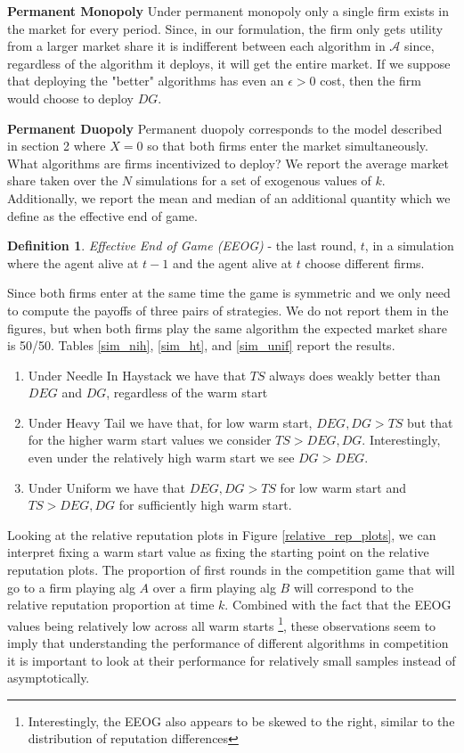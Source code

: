 \documentclass{article}
\theoremstyle{definition}
\newtheorem{definition}{Definition}
\begin{document}
\textbf{Permanent Monopoly} Under permanent monopoly only a single firm exists in the market for every period. Since, in our formulation, the firm only gets utility from a larger market share it is indifferent between each algorithm in $\mathcal{A}$ since, regardless of the algorithm it deploys, it will get the entire market. If we suppose that deploying the "better" algorithms has even an $\epsilon > 0$ cost, then the firm would choose to deploy $DG$.

\textbf{Permanent Duopoly} Permanent duopoly corresponds to the model described in section 2 where $X = 0$ so that both firms enter the market simultaneously. What algorithms are firms incentivized to deploy? We report the average market share taken over the $N$ simulations for a set of exogenous values of $k$. Additionally, we report the mean and median of an additional quantity which we define as the effective end of game.

\begin{definition}
\textit{Effective End of Game (EEOG)} - the last round, $t$, in a simulation where the agent alive at $t-1$ and the agent alive at $t$ choose different firms.
\end{definition}

Since both firms enter at the same time the game is symmetric and we only need to compute the payoffs of three pairs of strategies. We do not report them in the figures, but when both firms play the same algorithm the expected market share is 50/50. Tables \ref{sim_nih}, \ref{sim_ht}, and \ref{sim_unif} report the results.
\begin{enumerate}
\item Under Needle In Haystack we have that $TS$ always does weakly better than $DEG$ and $DG$, regardless of the warm start
\item Under Heavy Tail we have that, for low warm start, $DEG, DG > TS$ but that for the higher warm start values we consider $TS > DEG, DG$. Interestingly, even under the relatively high warm start we see $DG > DEG$.
\item Under Uniform we have that $DEG, DG > TS$ for low warm start and $TS > DEG, DG$ for sufficiently high warm start.
\end{enumerate}

Looking at the relative reputation plots in Figure \ref{relative_rep_plots}, we can interpret fixing a warm start value as fixing the starting point on the relative reputation plots. The proportion of first rounds in the competition game that will go to a firm playing alg $A$ over a firm playing alg $B$ will correspond to the relative reputation proportion at time $k$. Combined with the fact that the EEOG values being relatively low across all warm starts \footnote{Interestingly, the EEOG also appears to be skewed to the right, similar to the distribution of reputation differences}, these observations seem to imply that understanding the performance of different algorithms in competition it is important to look at their performance for relatively small samples instead of asymptotically.
\end{document}

